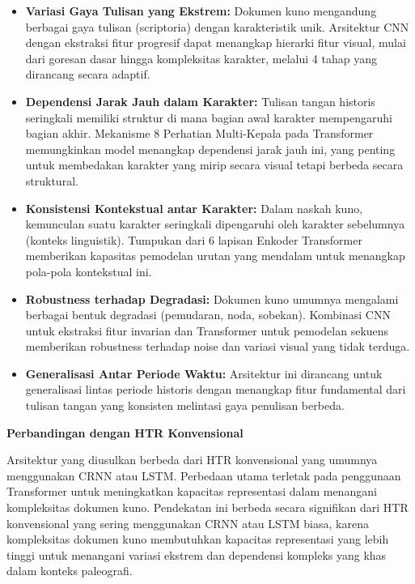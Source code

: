 \documentclass[12pt,a4paper]{article}
\begin{document}
\begin{itemize}
    \item \textbf{Variasi Gaya Tulisan yang Ekstrem:} Dokumen kuno mengandung berbagai gaya tulisan (scriptoria) dengan karakteristik unik. Arsitektur CNN dengan ekstraksi fitur progresif dapat menangkap hierarki fitur visual, mulai dari goresan dasar hingga kompleksitas karakter, melalui 4 tahap yang dirancang secara adaptif.

    \item \textbf{Dependensi Jarak Jauh dalam Karakter:} Tulisan tangan historis seringkali memiliki struktur di mana bagian awal karakter mempengaruhi bagian akhir. Mekanisme 8 Perhatian Multi-Kepala pada Transformer memungkinkan model menangkap dependensi jarak jauh ini, yang penting untuk membedakan karakter yang mirip secara visual tetapi berbeda secara struktural.

    \item \textbf{Konsistensi Kontekstual antar Karakter:} Dalam naskah kuno, kemunculan suatu karakter seringkali dipengaruhi oleh karakter sebelumnya (konteks linguistik). Tumpukan dari 6 lapisan Enkoder Transformer memberikan kapasitas pemodelan urutan yang mendalam untuk menangkap pola-pola kontekstual ini.

    \item \textbf{Robustness terhadap Degradasi:} Dokumen kuno umumnya mengalami berbagai bentuk degradasi (pemudaran, noda, sobekan). Kombinasi CNN untuk ekstraksi fitur invarian dan Transformer untuk pemodelan sekuens memberikan robustness terhadap noise dan variasi visual yang tidak terduga.

    \item \textbf{Generalisasi Antar Periode Waktu:} Arsitektur ini dirancang untuk generalisasi lintas periode historis dengan menangkap fitur fundamental dari tulisan tangan yang konsisten melintasi gaya penulisan berbeda.
\end{itemize}

\textbf{Perbandingan dengan HTR Konvensional}

Arsitektur yang diusulkan berbeda dari HTR konvensional yang umumnya menggunakan CRNN atau LSTM. Perbedaan utama terletak pada penggunaan Transformer untuk meningkatkan kapacitas representasi dalam menangani kompleksitas dokumen kuno. Pendekatan ini berbeda secara signifikan dari HTR konvensional yang sering menggunakan CRNN atau LSTM biasa, karena kompleksitas dokumen kuno membutuhkan kapacitas representasi yang lebih tinggi untuk menangani variasi ekstrem dan dependensi kompleks yang khas dalam konteks paleografi.
\end{document}
